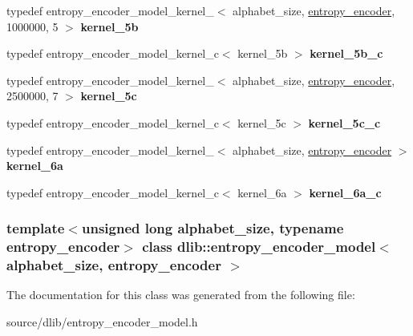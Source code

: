 \begin{DoxyCompactItemize}
\item 
\hypertarget{classdlib_1_1entropy__encoder__model_a7299539ddefa6e9936bdbcf9205dcc55}{
typedef entropy\_\-encoder\_\-model\_\-kernel\_$<$ alphabet\_\-size, \hyperlink{classdlib_1_1entropy__encoder}{entropy\_\-encoder}, 1000000, 5 $>$ {\bfseries kernel\_\-5b}}
\label{classdlib_1_1entropy__encoder__model_a7299539ddefa6e9936bdbcf9205dcc55}

\item 
\hypertarget{classdlib_1_1entropy__encoder__model_a491aeb366f9db424635a462772cb40b0}{
typedef entropy\_\-encoder\_\-model\_\-kernel\_\-c$<$ kernel\_\-5b $>$ {\bfseries kernel\_\-5b\_\-c}}
\label{classdlib_1_1entropy__encoder__model_a491aeb366f9db424635a462772cb40b0}

\item 
\hypertarget{classdlib_1_1entropy__encoder__model_a0f5b9599644ce21dca4c78593f44282d}{
typedef entropy\_\-encoder\_\-model\_\-kernel\_$<$ alphabet\_\-size, \hyperlink{classdlib_1_1entropy__encoder}{entropy\_\-encoder}, 2500000, 7 $>$ {\bfseries kernel\_\-5c}}
\label{classdlib_1_1entropy__encoder__model_a0f5b9599644ce21dca4c78593f44282d}

\item 
\hypertarget{classdlib_1_1entropy__encoder__model_a4cc527c8f4684281e866a06409028ac4}{
typedef entropy\_\-encoder\_\-model\_\-kernel\_\-c$<$ kernel\_\-5c $>$ {\bfseries kernel\_\-5c\_\-c}}
\label{classdlib_1_1entropy__encoder__model_a4cc527c8f4684281e866a06409028ac4}

\item 
\hypertarget{classdlib_1_1entropy__encoder__model_a7086dd46c383a76ba2ae9c88bd25a646}{
typedef entropy\_\-encoder\_\-model\_\-kernel\_$<$ alphabet\_\-size, \hyperlink{classdlib_1_1entropy__encoder}{entropy\_\-encoder} $>$ {\bfseries kernel\_\-6a}}
\label{classdlib_1_1entropy__encoder__model_a7086dd46c383a76ba2ae9c88bd25a646}

\item 
\hypertarget{classdlib_1_1entropy__encoder__model_a608120f100790cfbbe4681bcd15e9cd4}{
typedef entropy\_\-encoder\_\-model\_\-kernel\_\-c$<$ kernel\_\-6a $>$ {\bfseries kernel\_\-6a\_\-c}}
\label{classdlib_1_1entropy__encoder__model_a608120f100790cfbbe4681bcd15e9cd4}

\end{DoxyCompactItemize}
\subsubsection*{template$<$unsigned long alphabet\_\-size, typename entropy\_\-encoder$>$ class dlib::entropy\_\-encoder\_\-model$<$ alphabet\_\-size, entropy\_\-encoder $>$}



The documentation for this class was generated from the following file:\begin{DoxyCompactItemize}
\item 
source/dlib/entropy\_\-encoder\_\-model.h\end{DoxyCompactItemize}
